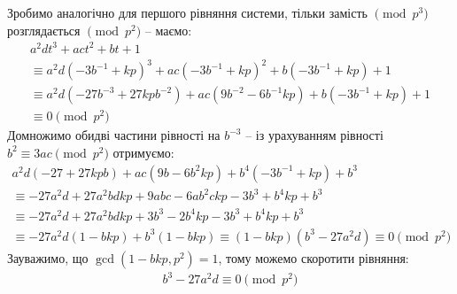 \documentclass{thesis}
\begin{document}
Зробимо аналогічно для першого рівняння системи, тільки замість $\pmod {p^3}$ розглядається $\pmod {p^2}$ -- маємо:
\begin{multline*}
a^2 dt^3 + act^2 + bt + 1 \\ \equiv a^2 d (-3b^{-1} + kp)^3 + ac (-3b^{-1} + kp)^2 + b (-3b^{-1} + kp) + 1 \\
\equiv a^2 d (-27 b^{-3} + 27kp b^{-2}) + ac (9b^{-2} - 6b^{-1}kp) + b(-3b^{-1} + kp) + 1 \\ \equiv 0 \pmod {p^2}
\end{multline*}
Домножимо обидві частини рівності на $b^{-3}$ -- із урахуванням рівності $b^2 \equiv 3 ac \pmod {p^2}$ отримуємо:
\begin{multline*}
a^2 d(-27 + 27 kpb) + ac(9b - 6b^2 kp) + b^4(-3b^{-1} + kp) + b^3 \\
\equiv -27a^2d  + 27 a^2 b d k p + 9abc - 6 ab^2 c kp - 3b^3 + b^4 kp + b^3 \\
\equiv -27a^2d + 27 a^2 b d k p + 3b^3 - 2 b^4 kp - 3b^3 + b^4 kp + b^3 \\
\equiv -27a^2d (1 - bkp) + b^3(1 - bkp) \equiv (1-bkp)(b^3 - 27a^2d) \equiv 0 \pmod {p^2}
\end{multline*}
Зауважимо, що $\gcd(1-bkp, p^2) = 1$, тому можемо скоротити рівняння:
\begin{align*}
b^3 - 27a^2 d \equiv 0 \pmod {p^2}
\end{align*}
\end{document}
